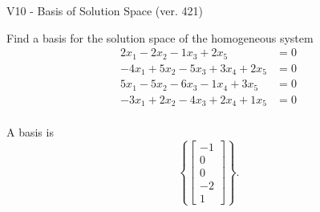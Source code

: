 \begin{exercise}
  \begin{exerciseTitle}V10 - Basis of Solution Space (ver. 421)\end{exerciseTitle}
  \begin{exerciseStatement}
    Find a basis for the solution space of the homogeneous system 
\begin{align*}
 2 x_ 1 -2 x_ 2 -1 x_ 3 + 2 x_ 5 &= 0  \\ 
  -4 x_ 1 + 5 x_ 2 -5 x_ 3 + 3 x_ 4 + 2 x_ 5 &= 0  \\ 
  5 x_ 1 -5 x_ 2 -6 x_ 3 -1 x_ 4 + 3 x_ 5 &= 0  \\ 
  -3 x_ 1 + 2 x_ 2 -4 x_ 3 + 2 x_ 4 + 1 x_ 5 &= 0  \\ 
 \end{align*}


 
  \end{exerciseStatement}

  \begin{exerciseAnswer}
   A basis is   
\[\left\{\left[\begin{array}{c}
-1 \\
0 \\
0 \\
-2 \\
1
\end{array}\right]\right\}.\]

  


  \end{exerciseAnswer}
\end{exercise}